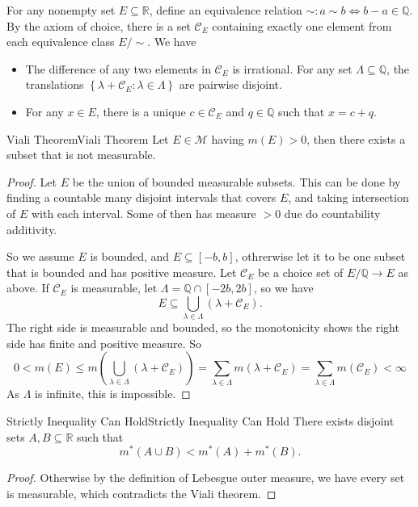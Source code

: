 \documentclass[../main.tex]{subfiles}
\begin{document}
For any nonempty set $E \subseteq \mathbb{R}$, define an equivalence relation $\sim: a\sim b \Leftrightarrow b-a\in \mathbb{Q}$. By the axiom of choice, there is a set $\mathcal{C}_E$ containing exactly one element from each equivalence class $E / \sim$.  We have
 \begin{itemize}
	 \item The difference of any two elements in $\mathcal{C}_E$ is irrational. For any set $\Lambda \subseteq \mathbb{Q}$, the translations $\left\{ \lambda + \mathcal{C}_E: \lambda\in \Lambda \right\}$ are pairwise disjoint.
	 \item For any $x\in E$, there is a unique $c\in \mathcal{C}_E$ and $q\in \mathbb{Q}$ such that $x = c + q$.
\end{itemize}

\begin{theorem}{Viali Theorem}{Viali Theorem}
	Let $E \in \mathcal{M}$ having $m(E) > 0$, then there exists a subset that is not measurable.
\end{theorem}
\begin{proof}
Let $E$ be the union of bounded measurable subsets. This can be done by finding a countable many disjoint intervals that covers $E$, and taking intersection of $E$ with each interval. Some of then has measure $>0$ due do countability additivity.

So we assume $E$ is bounded, and $E \subseteq [-b,b]$, othrerwise let it to be one subset that is bounded and has positive measure. Let $\mathcal{C}_E$ be a choice set of $E / \mathbb{Q} \rightarrow E$ as above. If $\mathcal{C}_E$ is measurable, let $\Lambda = \mathbb{Q}\cap [-2b,2b]$, so we have
\begin{equation*}
	E \subseteq \bigcup_{\lambda\in \Lambda} (\lambda + \mathcal{C}_E).
\end{equation*}
The right side is measurable and bounded, so the monotonicity shows the right side has finite and positive measure. So
\begin{equation*}
	0<m(E) \leq m\left( \bigcup_{\lambda\in \Lambda} (\lambda + \mathcal{C}_E) \right) = \sum_{\lambda\in \Lambda} m(\lambda + \mathcal{C}_E) = \sum_{\lambda\in \Lambda} m(\mathcal{C}_E)<\infty 
\end{equation*}
As $\Lambda$ is infinite, this is impossible.
\end{proof}

\begin{corollary}{Strictly Inequality Can Hold}{Strictly Inequality Can Hold}
	There exists disjoint sets $A,B \subseteq \mathbb{R}$ such that
	\begin{equation*}
	m^*(A \cup B) < m^*(A) + m^*(B).
	\end{equation*}
\end{corollary}
\begin{proof}
Otherwise by the definition of Lebesgue outer measure, we have every set is measurable, which contradicts the Viali theorem.
\end{proof}
\end{document}
